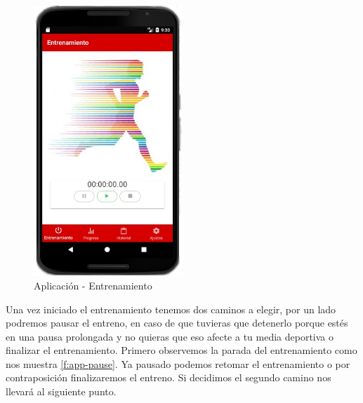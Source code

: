 \documentclass[a4paper, 11pt]{article}
\begin{document}
\begin{itemize}
              \begin{figure}[H]
               \centering
               \includegraphics[width=0.5\textwidth]{2entrenamiento}
               \caption{Aplicación - Entrenamiento}
               \label{f:app-entrenamiento}
              \end{figure}

      Una vez iniciado el entrenamiento tenemos dos caminos a elegir, por un lado podremos pausar
      el entreno, en caso de que tuvieras que detenerlo porque estés en una pausa prolongada y no quieras
      que eso afecte a tu media deportiva o finalizar el entrenamiento. Primero observemos la parada del
      entrenamiento como nos muestra \ref{f:app-pause}. Ya pausado podemos retomar el entrenamiento o
      por contraposición finalizaremos el entreno. Si decidimos el segundo camino nos llevará al siguiente
      punto.\\



\end{itemize}
\end{document}
